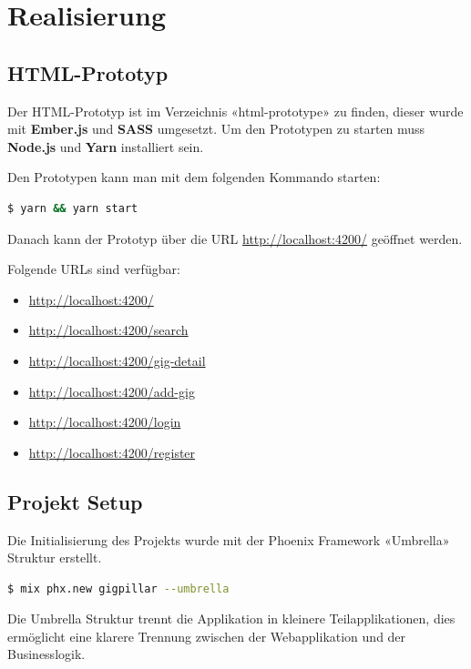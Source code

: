 \chapter{Realisierung}\label{AppendixRealisierung}

\section{HTML-Prototyp}

Der HTML-Prototyp ist im Verzeichnis «html-prototype» zu finden, dieser wurde
mit \textbf{Ember.js} und \textbf{SASS} umgesetzt.
Um den Prototypen zu starten muss \textbf{Node.js} und \textbf{Yarn} installiert sein.


\noindent
Den Prototypen kann man mit dem folgenden Kommando starten:

\begin{lstlisting}[language=bash,frame=single]
$ yarn && yarn start
\end{lstlisting}

\noindent
Danach kann der Prototyp über die URL \url{http://localhost:4200/} geöffnet werden.

\noindent
Folgende URLs sind verfügbar:

\begin{itemize}
  \tightlist{}
  \item{} \url{http://localhost:4200/}
  \item{} \url{http://localhost:4200/search}
  \item{} \url{http://localhost:4200/gig-detail}
  \item{} \url{http://localhost:4200/add-gig}
  \item{} \url{http://localhost:4200/login}
  \item{} \url{http://localhost:4200/register}
\end{itemize}

\clearpage
\section{Projekt Setup}

Die Initialisierung des Projekts wurde mit der Phoenix Framework «Umbrella»
Struktur erstellt.

\begin{lstlisting}[language=bash,frame=single]
$ mix phx.new gigpillar --umbrella
\end{lstlisting}

Die Umbrella Struktur trennt die Applikation in kleinere Teilapplikationen,
dies ermöglicht eine klarere Trennung zwischen der Webapplikation und der Businesslogik.

